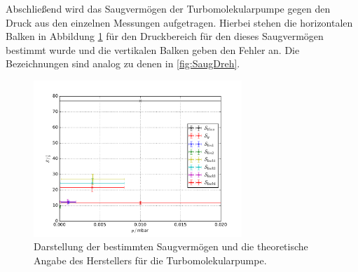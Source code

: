 Abschließend wird das Saugvermögen der Turbomolekularpumpe gegen den Druck aus den einzelnen Messungen aufgetragen. Hierbei
stehen die horizontalen Balken in Abbildung \ref{fig:SaugTurbo} für den Druckbereich für den dieses Saugvermögen bestimmt wurde
und die vertikalen Balken geben den Fehler an. Die Bezeichnungen sind analog zu denen in \ref{fig:SaugDreh}.
\begin{figure}[H]
  \centering
  \includegraphics[width=0.7\textwidth]{plots/SaugverTurbo.pdf}
  \caption{Darstellung der bestimmten Saugvermögen und die theoretische Angabe des Herstellers für die Turbomolekularpumpe.}
  \label{fig:SaugTurbo}
\end{figure}
